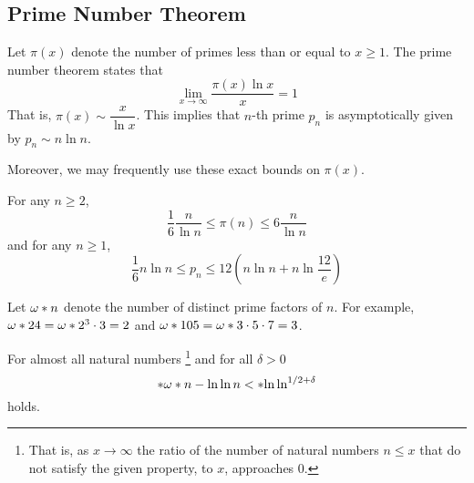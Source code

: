 \subsection{Prime Number Theorem}
\begin{theorem}\label{thm:pnt}
	Let \(\pi(x)\) denote the number of primes less than or equal to \(x \geq 1\). The prime number theorem states that 
	\begin{equation*}
		\lim_{x \to \infty} \dfrac{\pi(x) \ln x}{x} = 1
	\end{equation*}
	That is, \(\pi(x) \sim \dfrac{x}{\ln x}\). This implies that \(n\)-th prime \(p_n\) is asymptotically given by \(p_n \sim n \ln n\).
\end{theorem}

Moreover, we may frequently use these exact bounds on \(\pi(x)\).
\begin{lemma}\label{lmm:ineqpnt}
	For any \(n \geq 2\), 
	\begin{equation*}
		\dfrac{1}{6} \dfrac{n}{\ln n} \leq \pi(n) \leq 6 \dfrac{n}{\ln n}
	\end{equation*}
	and for any \(n \geq 1\),
	\begin{equation*}
		\dfrac{1}{6} n \ln n \leq p_n \leq 12 (n \ln n + n \ln \frac{12}{e})
	\end{equation*}
\end{lemma}

Let \(\func{\omega}{n}\) denote the number of distinct prime factors of \(n\). For example, \(\func{\omega}{24} = \func{\omega}{2^3 \cdot 3} = 2\) and \(\func{\omega}{105} = \func{\omega}{3 \cdot 5 \cdot 7} = 3\). 

\begin{theorem}\label{thm:uniqueprimeorder}
	For almost all natural numbers \footnote{
		That is, as \(x \to \infty\) the ratio of the number of natural numbers \(n \leq x\) that do not satisfy the given property, to \(x\), approaches 0.
	} and for all \(\delta > 0\)
	\begin{equation*}
		\abs{\func{\omega}{n} - \ln \ln n} < \bracket{\ln \ln}^{1/2 + \delta}
	\end{equation*} 
	holds.
\end{theorem}